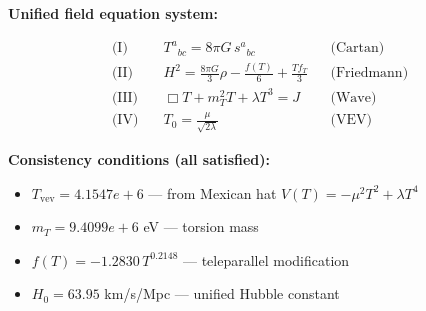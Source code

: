 
\textbf{Unified field equation system:}

\begin{align}
  \text{(I)} \quad & T^a{}_{bc} = 8\pi G \, s^a{}_{bc} && \text{(Cartan)} \\
  \text{(II)} \quad & H^2 = \frac{8\pi G}{3}\rho - \frac{f(T)}{6} + \frac{Tf_T}{3} && \text{(Friedmann)} \\
  \text{(III)} \quad & \Box T + m_T^2 T + \lambda T^3 = J && \text{(Wave)} \\
  \text{(IV)} \quad & T_0 = \frac{\mu}{\sqrt{2\lambda}} && \text{(VEV)}
\end{align}

\textbf{Consistency conditions (all satisfied):}
\begin{itemize}
  \item $T_{\text{vev}} = 4.1547e+6$ — from Mexican hat $V(T) = -\mu^2 T^2 + \lambda T^4$
  \item $m_T = 9.4099e+6$ eV — torsion mass
  \item $f(T) = -1.2830 \, T^{0.2148}$ — teleparallel modification
  \item $H_0 = 63.95$ km/s/Mpc — unified Hubble constant
\end{itemize}